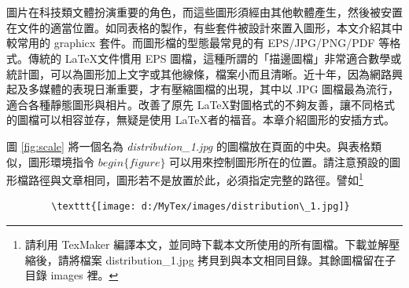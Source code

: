 %
%
\chapter{ }
圖片在科技類文體扮演重要的角色，而這些圖形須經由其他軟體產生，然後被安置在文件的適當位置。如同表格的製作，有些套件被設計來置入圖形，本文介紹其中較常用的 graphicx 套件。而圖形檔的型態最常見的有 EPS/JPG/PNG/PDF 等格式。傳統的 \LaTeX 文件慣用 EPS 圖檔，這種所謂的「描邊圖檔」非常適合數學或統計圖，可以為圖形加上文字或其他線條，檔案小而且清晰。近十年，因為網路興起及多媒體的表現日漸重要，才有壓縮圖檔的出現，其中以 JPG 圖檔最為流行，適合各種靜態圖形與相片。\XeLaTeX 改善了原先 \LaTeX 對圖格式的不夠友善，讓不同格式的圖檔可以相容並存，無疑是使用 \LaTeX 者的福音。本章介紹圖形的安插方式。

圖 \ref{fig:scale} 將一個名為  \textit{distribution\_1.jpg} 的圖檔放在頁面的中央。與表格類似，圖形環境指令 $begin\{figure\}$ 可以用來控制圖形所在的位置。請注意預設的圖形檔路徑與文章相同，圖形若不是放置於此，必須指定完整的路徑。譬如\footnote{請利用  TexMaker 編譯本文，並同時下載本文所使用的所有圖檔。下載並解壓縮後，請將檔案  distribution\_1.jpg 拷貝到與本文相同目錄。其餘圖檔留在子目錄  images 裡。}

\bigskip
	\begin{lstlisting}
		\texttt{[image: d:/MyTex/images/distribution\_1.jpg]}
	\end{lstlisting}
\bigskip

